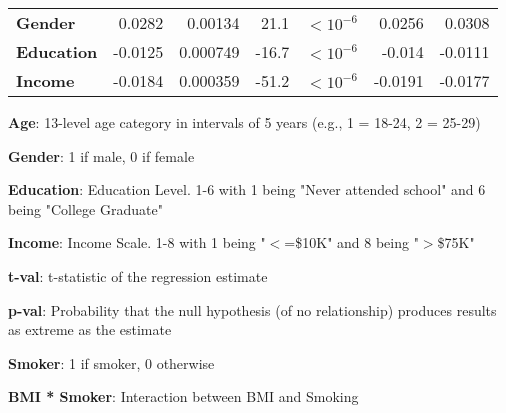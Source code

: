 \documentclass[11pt]{article}
\begin{document}
\begin{table}[h]
\begin{threeparttable}
{\begin{tabular}{lrrrlrr}
\textbf{Gender} & \raisebox{2ex}{\hypertarget{C6a}{}}0.0282 & \raisebox{2ex}{\hypertarget{C6b}{}}0.00134 & \raisebox{2ex}{\hypertarget{C6c}{}}21.1 & $<$\raisebox{2ex}{\hypertarget{C6d}{}}$10^{-6}$ & \raisebox{2ex}{\hypertarget{C6e}{}}0.0256 & \raisebox{2ex}{\hypertarget{C6f}{}}0.0308 \\
\textbf{Education} & \raisebox{2ex}{\hypertarget{C7a}{}}-0.0125 & \raisebox{2ex}{\hypertarget{C7b}{}}0.000749 & \raisebox{2ex}{\hypertarget{C7c}{}}-16.7 & $<$\raisebox{2ex}{\hypertarget{C7d}{}}$10^{-6}$ & \raisebox{2ex}{\hypertarget{C7e}{}}-0.014 & \raisebox{2ex}{\hypertarget{C7f}{}}-0.0111 \\
\textbf{Income} & \raisebox{2ex}{\hypertarget{C8a}{}}-0.0184 & \raisebox{2ex}{\hypertarget{C8b}{}}0.000359 & \raisebox{2ex}{\hypertarget{C8c}{}}-51.2 & $<$\raisebox{2ex}{\hypertarget{C8d}{}}$10^{-6}$ & \raisebox{2ex}{\hypertarget{C8e}{}}-0.0191 & \raisebox{2ex}{\hypertarget{C8f}{}}-0.0177 \\
\bottomrule
\end{tabular}}
\begin{tablenotes}
\footnotesize
\item \textbf{Age}: 13-level age category in intervals of 5 years (e.g., 1 = 18-24, 2 = 25-29)
\item \textbf{Gender}: 1 if male, 0 if female
\item \textbf{Education}: Education Level. 1-6 with 1 being "Never attended school" and 6 being "College Graduate"
\item \textbf{Income}: Income Scale. 1-8 with 1 being "$<$=\$10K" and 8 being "$>$\$75K"
\item \textbf{t-val}: t-statistic of the regression estimate
\item \textbf{p-val}: Probability that the null hypothesis (of no relationship) produces results as extreme as the estimate
\item \textbf{Smoker}: 1 if smoker, 0 otherwise
\item \textbf{BMI * Smoker}: Interaction between BMI and Smoking
\end{tablenotes}
\end{threeparttable}
\end{table}
\end{document}
